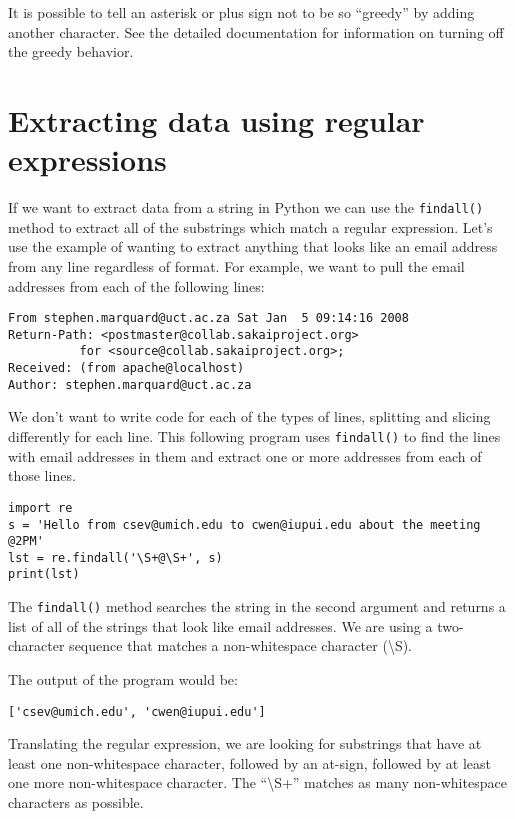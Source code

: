 It is possible to tell an asterisk or plus sign not to be so ``greedy'' by adding 
another character.   See the detailed documentation for information on turning off the 
greedy behavior.

\section{Extracting data using regular expressions}

If we want to extract data from a string in Python we can use the {\tt findall()} method to extract
all of the substrings which match a regular expression.  Let's use the example of wanting to extract
anything that looks like an email address from any line regardless of format.  For example, we want
to pull the email addresses from each of the following lines:

\beforeverb
\begin{verbatim}
From stephen.marquard@uct.ac.za Sat Jan  5 09:14:16 2008
Return-Path: <postmaster@collab.sakaiproject.org>
          for <source@collab.sakaiproject.org>;
Received: (from apache@localhost)
Author: stephen.marquard@uct.ac.za
\end{verbatim}
\afterverb
%
We don't want to write code for each of the types of lines, splitting and slicing differently for each
line.  This following program uses {\tt findall()} to find the lines with email addresses in them and
extract one or more addresses from each of those lines.

\beforeverb
\begin{verbatim}
import re
s = 'Hello from csev@umich.edu to cwen@iupui.edu about the meeting @2PM'
lst = re.findall('\S+@\S+', s)
print(lst)
\end{verbatim}
\afterverb
%
The {\tt findall()} method searches the string in the second argument and returns a list of
all of the strings that look like email addresses.   We are using a two-character sequence 
that matches a non-whitespace character ({\textbackslash}S). 

The output of the program would be:

\beforeverb
\begin{verbatim}
['csev@umich.edu', 'cwen@iupui.edu']
\end{verbatim}
\afterverb
%
Translating the regular expression, we are looking for substrings that have at least one
non-whitespace character, followed by an at-sign, followed by at least one more non-whitespace
character.  The ``{\textbackslash}S+'' matches as many non-whitespace characters as possible.

